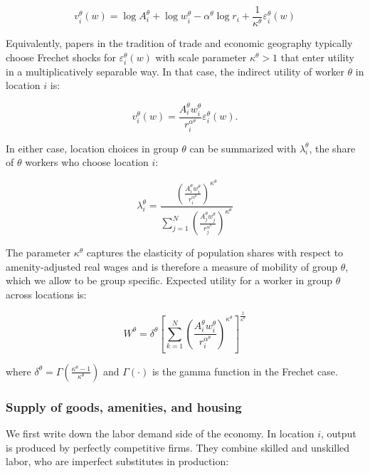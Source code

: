 \begin{equation*}
  v_i^{\theta}(w) = \log A_i^{\theta} + \log w_i^{\theta} - \alpha^{\theta} \log r_i + \frac{1}{\kappa^{\theta}} \varepsilon_i^{\theta}(w)
\end{equation*}

Equivalently, papers in the tradition of trade and economic geography typically choose Frechet shocks for $\varepsilon_i^{\theta}(w)$ with scale parameter $\kappa^{\theta} > 1$ that enter utility in a multiplicatively separable way. In that case, the indirect utility of worker $\theta$ in location $i$ is:

\begin{equation*}
  v_i^{\theta}(w) = \frac{A_i^{\theta} w_i^{\theta}}{r_i^{\alpha^{\theta}}} \varepsilon_i^{\theta}(w).
\end{equation*}

In either case, location choices in group $\theta$ can be summarized with $\lambda_i^{\theta}$, the share of $\theta$ workers who choose location $i$:

\begin{equation}
  \lambda_i^{\theta} = \frac{ (\frac{A_i^{\theta} w_i^{\theta}}{r_i^{\alpha^{\theta}}})^{\kappa^{\theta}}}{ \sum_{j=1}^N ( \frac{A_j^{\theta} w_j^{\theta}}{r_j^{\alpha^{\theta}}})^{\kappa^{\theta}} }
\end{equation}

The parameter $\kappa^{\theta}$ captures the elasticity of population shares with respect to amenity-adjusted real wages and is therefore a measure of mobility of group $\theta$, which we allow to be group specific. Expected utility for a worker in group $\theta$ across locations is:

\begin{equation}
  W^{\theta} = \delta^{\theta} \left[ \sum_{k=1}^N (\frac{A_i^{\theta} w_i^{\theta}}{r_i^{\alpha^{\theta}}})^{\kappa^{\theta}} \right]^{\frac{1}{\kappa^{\theta}}}
\end{equation}

where $\delta^{\theta} = \Gamma(\frac{\kappa^{\theta} - 1}{\kappa^{\theta}})$ and $\Gamma(\cdot)$ is the gamma function in the Frechet case.

\subsubsection{Supply of goods, amenities, and housing}

We first write down the labor demand side of the economy. In location $i$, output is produced by perfectly competitive firms. They combine skilled and unskilled labor, who are imperfect substitutes in production:

